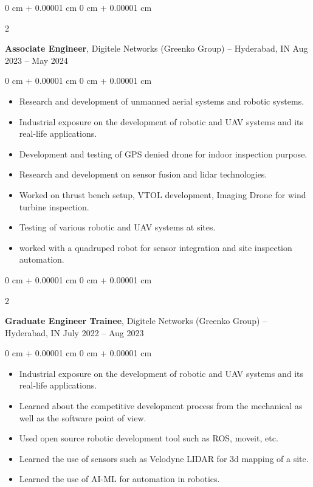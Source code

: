 \documentclass[10pt, letterpaper]{article}
\newenvironment{highlights}{
    \begin{itemize}[
        topsep=0.10 cm,
        parsep=0.10 cm,
        partopsep=0pt,
        itemsep=0pt,
        leftmargin=0 cm + 10pt
    ]
}{
    \end{itemize}
} %
\newenvironment{onecolentry}{
    \begin{adjustwidth}{
        0 cm + 0.00001 cm
    }{
        0 cm + 0.00001 cm
    }
}{
    \end{adjustwidth}
} %
\newenvironment{twocolentry}[2][]{
    \onecolentry
    \def\secondColumn{#2}
    \setcolumnwidth{\fill, 4.5 cm}
    \begin{paracol}{2}
}{
    \switchcolumn \raggedleft \secondColumn
    \end{paracol}
    \endonecolentry
} %
\begin{document}
        \vspace{0.1 cm}

        \begin{twocolentry}{
            Aug 2023 – May 2024
        }
            \textbf{Associate Engineer}, Digitele Networks (Greenko Group) -- Hyderabad, IN\end{twocolentry}

        \vspace{0.10 cm}
        \begin{onecolentry}
            \begin{highlights}
                \item Research and development of unmanned aerial systems and robotic systems.
                \item Industrial exposure on the development of robotic and UAV systems and its real-life applications.
                \item Development and testing of GPS denied drone for indoor inspection purpose.                 \item Research and development on sensor fusion and lidar technologies.
                \item Worked on thrust bench setup, VTOL development, Imaging Drone for wind turbine inspection. 
                \item Testing of various robotic and UAV systems at sites.
                \item worked with a quadruped robot for sensor integration and site inspection automation.
            \end{highlights}
        \end{onecolentry}
        
         \vspace{0.2 cm}

        \begin{twocolentry}{
            July 2022 – Aug 2023
        }
            \textbf{Graduate Engineer Trainee}, Digitele Networks (Greenko Group) -- Hyderabad, IN\end{twocolentry}

        \vspace{0.10 cm}
        \begin{onecolentry}
            \begin{highlights}
                \item Industrial exposure on the development of robotic and UAV systems and its real-life applications.
                \item Learned about the competitive development process from the mechanical as well as the software point of view.
                \item Used open source robotic development tool such as ROS, moveit, etc.
                \item Learned the use of sensors such as Velodyne LIDAR for 3d mapping of a site.
                \item Learned the use of AI-ML for automation in robotics.
            \end{highlights}
        \end{onecolentry}
        
\end{document}
